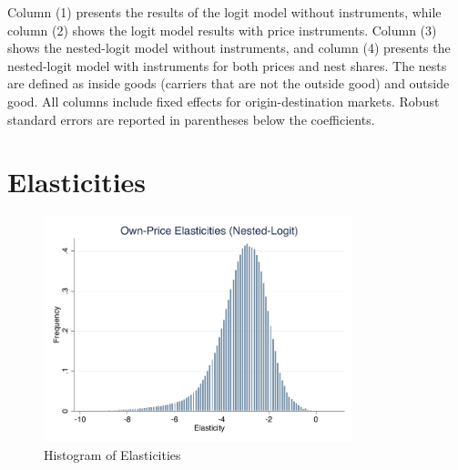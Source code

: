 \documentclass{article}
\begin{document}
Column (1) presents the results of the logit model without instruments,
while column (2) shows the logit model results with price instruments. 
Column (3) shows the nested-logit model without instruments, and 
column (4) presents the nested-logit model with instruments for both prices and nest shares.  The nests are defined as inside goods (carriers that are not the outside good) and outside good.
All columns include fixed effects for origin-destination markets. Robust standard errors are reported in parentheses below the coefficients.




\section{Elasticities}
\centering



\begin{figure}[htbp]
    \centering
    \includegraphics[width=0.8\textwidth]{../src/output/elasticity_logit_histogram.pdf}
    \caption{Histogram of Elasticities}
\end{figure}
\end{document}
